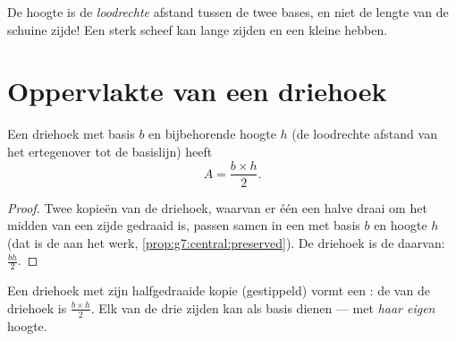 \begin{remark}
De hoogte is de \emph{loodrechte} afstand tussen de twee bases, en niet de lengte
van de schuine zijde! Een sterk scheef  kan lange zijden en een kleine
 hebben.
\end{remark}

\section{Oppervlakte van een driehoek}

\begin{theorem}[Driehoek]\label{thm:g7:areas:triangle}
Een driehoek met basis $b$ en bijbehorende hoogte $h$ (de loodrechte afstand van het
 ertegenover tot de basislijn) heeft 
\[
A = \frac{b \times h}{2} .
\]
\end{theorem}

\begin{proof}
Twee kopieën van de driehoek, waarvan er één een halve draai om het midden van een
zijde gedraaid is, passen samen in een  met basis $b$ en hoogte $h$
(dat is de  aan het werk, \cref{prop:g7:central:preserved}). De
driehoek is de  daarvan: $\frac{bh}{2}$.
\end{proof}

\begin{omfigure}

{\small Een driehoek met zijn halfgedraaide kopie (gestippeld) vormt een
: de  van de driehoek is $\frac{b\times h}{2}$. Elk van de
drie zijden kan als basis dienen --- met \emph{haar eigen} hoogte.}
\end{omfigure}

